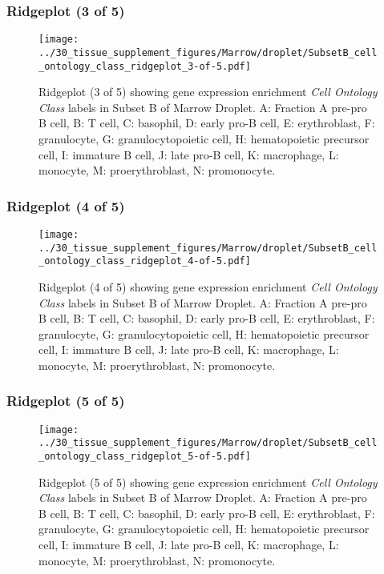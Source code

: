 \clearpage

\subsubsection{Ridgeplot (3 of 5)}
\begin{figure}[h]
\centering
\texttt{[image: ../30\_tissue\_supplement\_figures/Marrow/droplet/SubsetB\_cell\_ontology\_class\_ridgeplot\_3-of-5.pdf]}

\caption{ Ridgeplot (3 of 5)  showing gene expression enrichment \emph{Cell Ontology Class} labels in Subset B of Marrow Droplet. A: Fraction A pre-pro B cell, B: T cell, C: basophil, D: early pro-B cell, E: erythroblast, F: granulocyte, G: granulocytopoietic cell, H: hematopoietic precursor cell, I: immature B cell, J: late pro-B cell, K: macrophage, L: monocyte, M: proerythroblast, N: promonocyte.}
\end{figure}


\clearpage

\subsubsection{Ridgeplot (4 of 5)}
\begin{figure}[h]
\centering
\texttt{[image: ../30\_tissue\_supplement\_figures/Marrow/droplet/SubsetB\_cell\_ontology\_class\_ridgeplot\_4-of-5.pdf]}

\caption{ Ridgeplot (4 of 5)  showing gene expression enrichment \emph{Cell Ontology Class} labels in Subset B of Marrow Droplet. A: Fraction A pre-pro B cell, B: T cell, C: basophil, D: early pro-B cell, E: erythroblast, F: granulocyte, G: granulocytopoietic cell, H: hematopoietic precursor cell, I: immature B cell, J: late pro-B cell, K: macrophage, L: monocyte, M: proerythroblast, N: promonocyte.}
\end{figure}


\clearpage

\subsubsection{Ridgeplot (5 of 5)}
\begin{figure}[h]
\centering
\texttt{[image: ../30\_tissue\_supplement\_figures/Marrow/droplet/SubsetB\_cell\_ontology\_class\_ridgeplot\_5-of-5.pdf]}

\caption{ Ridgeplot (5 of 5)  showing gene expression enrichment \emph{Cell Ontology Class} labels in Subset B of Marrow Droplet. A: Fraction A pre-pro B cell, B: T cell, C: basophil, D: early pro-B cell, E: erythroblast, F: granulocyte, G: granulocytopoietic cell, H: hematopoietic precursor cell, I: immature B cell, J: late pro-B cell, K: macrophage, L: monocyte, M: proerythroblast, N: promonocyte.}
\end{figure}


